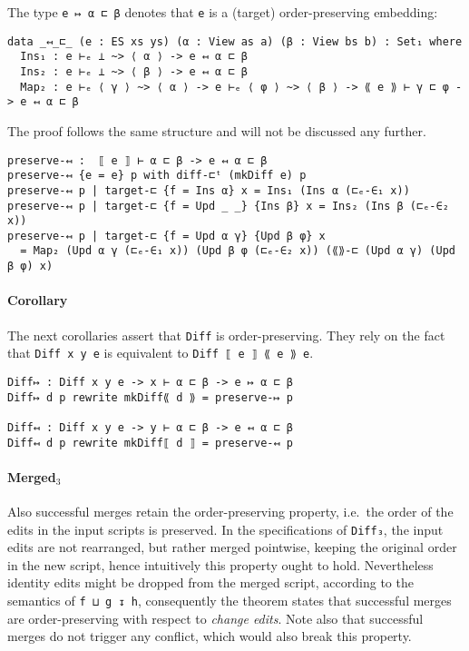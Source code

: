 \documentclass[../Thesis.tex]{subfiles}
\begin{document}
	The type \texttt{e ↦ α ⊏ β} denotes that \texttt{e} is a (target) 
	order-preserving embedding:

\begin{verbatim}
data _↤_⊏_ (e : ES xs ys) (α : View as a) (β : View bs b) : Set₁ where
  Ins₁ : e ⊢ₑ ⊥ ~> ⟨ α ⟩ -> e ↤ α ⊏ β
  Ins₂ : e ⊢ₑ ⊥ ~> ⟨ β ⟩ -> e ↤ α ⊏ β
  Map₂ : e ⊢ₑ ⟨ γ ⟩ ~> ⟨ α ⟩ -> e ⊢ₑ ⟨ φ ⟩ ~> ⟨ β ⟩ -> ⟪ e ⟫ ⊢ γ ⊏ φ -> e ↤ α ⊏ β
\end{verbatim}
         
	The proof follows the same structure and will not be discussed any further.
\begin{verbatim}
preserve-↤ :  ⟦ e ⟧ ⊢ α ⊏ β -> e ↤ α ⊏ β 
preserve-↤ {e = e} p with diff-⊏ᵗ (mkDiff e) p
preserve-↤ p | target-⊏ {f = Ins α} x = Ins₁ (Ins α (⊏ₑ-∈₁ x))
preserve-↤ p | target-⊏ {f = Upd _ _} {Ins β} x = Ins₂ (Ins β (⊏ₑ-∈₂ x))
preserve-↤ p | target-⊏ {f = Upd α γ} {Upd β φ} x 
  = Map₂ (Upd α γ (⊏ₑ-∈₁ x)) (Upd β φ (⊏ₑ-∈₂ x)) (⟪⟫-⊏ (Upd α γ) (Upd β φ) x) 
\end{verbatim}
	
	\paragraph{Corollary}
	The next corollaries assert that \texttt{Diff} is order-preserving.
 	They rely on the fact that \texttt{Diff x y e} is equivalent to
	\texttt{Diff ⟦ e ⟧ ⟪ e ⟫ e}.

\begin{verbatim}
Diff↦ : Diff x y e -> x ⊢ α ⊏ β -> e ↦ α ⊏ β
Diff↦ d p rewrite mkDiff⟪ d ⟫ = preserve-↦ p

Diff↤ : Diff x y e -> y ⊢ α ⊏ β -> e ↤ α ⊏ β
Diff↤ d p rewrite mkDiff⟦ d ⟧ = preserve-↤ p
\end{verbatim}

	\paragraph{Merged$_3$}
	Also successful merges retain the order-preserving property, i.e.\
	the order of the edits in the input scripts is preserved.
	In the specifications of \texttt{Diff₃}, the input edits are not rearranged, 
	but rather merged pointwise, keeping the original order in the new script,
	hence intuitively this property ought to hold.
	Nevertheless identity edits might be dropped from the merged script, 
	according to the semantics of \texttt{f ⊔ g ↧ h},
	consequently the theorem states that successful merges are 
	order-preserving with respect to \emph{change edits}.
	Note also that successful merges do not trigger any conflict, which
	would also break this property.
	
\end{document}
